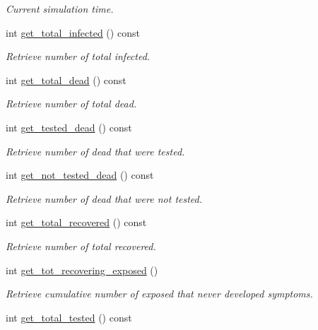 \begin{DoxyCompactItemize}
\begin{DoxyCompactList}\small\item\em Current simulation time. \end{DoxyCompactList}\item 
int \hyperlink{classABM_ade59d69b32a0a57c0e0c1e48c95a7524}{get\+\_\+total\+\_\+infected} () const
\begin{DoxyCompactList}\small\item\em Retrieve number of total infected. \end{DoxyCompactList}\item 
int \hyperlink{classABM_ad6d901acab9e9b92a0c992009ec51680}{get\+\_\+total\+\_\+dead} () const
\begin{DoxyCompactList}\small\item\em Retrieve number of total dead. \end{DoxyCompactList}\item 
int \hyperlink{classABM_a5eb770b49361e9d689bdcc9bdb2a28c0}{get\+\_\+tested\+\_\+dead} () const
\begin{DoxyCompactList}\small\item\em Retrieve number of dead that were tested. \end{DoxyCompactList}\item 
int \hyperlink{classABM_a0de2ff0011fffdfdd78c7a3fa7bdda8e}{get\+\_\+not\+\_\+tested\+\_\+dead} () const
\begin{DoxyCompactList}\small\item\em Retrieve number of dead that were not tested. \end{DoxyCompactList}\item 
int \hyperlink{classABM_a8fbf62a7df14f4ca34a69394d31834ed}{get\+\_\+total\+\_\+recovered} () const
\begin{DoxyCompactList}\small\item\em Retrieve number of total recovered. \end{DoxyCompactList}\item 
int \hyperlink{classABM_ae43e8808cb028d7a18841a66a9070937}{get\+\_\+tot\+\_\+recovering\+\_\+exposed} ()
\begin{DoxyCompactList}\small\item\em Retrieve cumulative number of exposed that never developed symptoms. \end{DoxyCompactList}\item 
int \hyperlink{classABM_af04a4eb713648b9a938d5b773a0b0ff5}{get\+\_\+total\+\_\+tested} () const
\item 

\end{DoxyCompactItemize}

